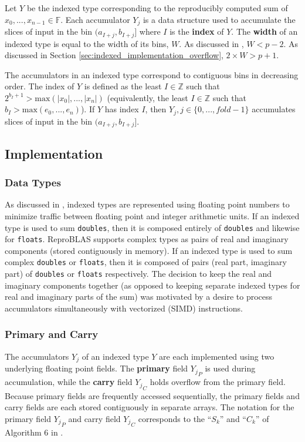 \documentclass[12pt]{article}
\providecommand{\F}{\ensuremath{\mathbb{F}}}
\providecommand{\Z}{\ensuremath{\mathbb{Z}}}
\providecommand{\max}{\ensuremath{\text{max}}}
\theoremstyle{plain}
\numberwithin{equation}{section}
\begin{document}
    Let $Y$ be the indexed type corresponding to the reproducibly computed sum of $x_0, ..., x_{n - 1} \in \F$.
    Each accumulator $Y_j$ is a data structure used to accumulate the slices of input in the bin $(a_{I + j}, b_{I + j}]$ where $I$ is the \textbf{index} of $Y$. The \textbf{width} of an indexed type is equal to the width of its bins, $W$. As discussed in \cite{repsum}, $W < p - 2$. As discussed in Section \ref{sec:indexed_implementation_overflow}, $2\times W > p + 1$.

    The accumulators in an indexed type correspond to contiguous bins in decreasing order. The index of $Y$ is defined as the least $I \in \Z$ such that $2^{b_I + 1} > \max(|x_0|, ..., |x_n|)$ (equivalently, the least $I \in \Z$ such that $b_I > \max(e_0, ..., e_n)$). If $Y$ has index $I$, then $Y_j, j \in \{0, ..., fold - 1\}$ accumulates slices of input in the bin $(a_{I + j}, b_{I + j}]$.

  \subsection{Implementation}
    \subsubsection{Data Types}
      \label{sec:indexed_implementation_datatypes}
      As discussed in \cite{repsum}, indexed types are represented using floating point numbers to minimize traffic between floating point and integer arithmetic units. If an indexed type is used to sum \verb|doubles|, then it is composed entirely of \verb|doubles| and likewise for \verb|floats|. ReproBLAS supports complex types as pairs of real and imaginary components (stored contiguously in memory). If an indexed type is used to sum complex \verb|doubles| or \verb|floats|, then it is composed of pairs (real part, imaginary part) of \verb|doubles| or \verb|floats| respectively. The decision to keep the real and imaginary components together (as opposed to keeping separate indexed types for real and imaginary parts of the sum) was motivated by a desire to process accumulators simultaneously with vectorized (SIMD) instructions.

    \subsubsection{Primary and Carry}
      \label{sec:indexed_implementation_primary_carry}
      The accumulators $Y_j$ of an indexed type $Y$ are each implemented using two underlying floating point fields. The \textbf{primary} field ${Y_j}_P$ is used during accumulation, while the \textbf{carry} field ${Y_j}_C$ holds overflow from the primary field. Because primary fields are frequently accessed sequentially, the primary fields and carry fields are each stored contiguously in separate arrays. The notation for the primary field ${Y_j}_P$ and carry field ${Y_j}_C$ corresponds to the ``$S_k$'' and ``$C_k$'' of Algorithm $6$ in \cite{repsum}.
\end{document}

